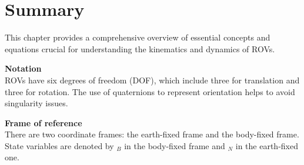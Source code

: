 



\section{Summary}

This chapter provides a comprehensive overview of essential 
concepts and equations crucial for understanding the kinematics and dynamics of ROVs.

\textbf{Notation} \\
ROVs have six degrees of freedom (DOF), which include three for translation and three for rotation.
The use of quaternions to represent orientation helps to avoid singularity issues.

\textbf{Frame of reference} \\
There are two coordinate frames: the earth-fixed frame and the body-fixed frame. 
State variables are denoted by $_B$ in the body-fixed frame and $_N$ in the earth-fixed one.

